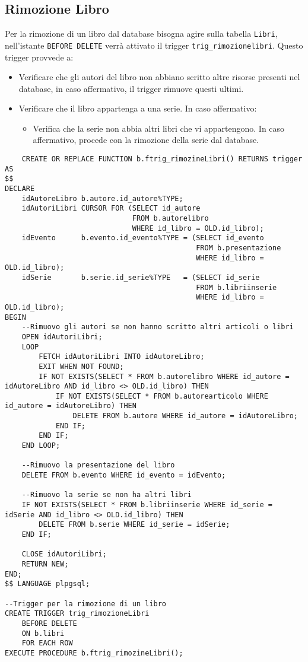 \subsection{Rimozione Libro}
Per la rimozione di un libro dal database bisogna agire sulla tabella \texttt{Libri}, nell'istante
\texttt{BEFORE DELETE} verr\`a attivato il trigger \texttt{trig\_rimozionelibri}. Questo trigger provvede a:
\begin{itemize}
    \item Verificare che gli autori del libro non abbiano scritto altre risorse presenti nel database, in
          caso affermativo, il trigger rimuove questi ultimi.
    \item Verificare che il libro appartenga a una serie. In caso affermativo:
    \begin{itemize}
        \item Verifica che la serie non abbia altri libri che vi appartengono. In caso affermativo,
        procede con la rimozione della serie dal database.
    \end{itemize}
\end{itemize}

\begin{lstlisting}
    CREATE OR REPLACE FUNCTION b.ftrig_rimozineLibri() RETURNS trigger AS
$$
DECLARE
    idAutoreLibro b.autore.id_autore%TYPE;
    idAutoriLibri CURSOR FOR (SELECT id_autore
                              FROM b.autorelibro
                              WHERE id_libro = OLD.id_libro);
    idEvento      b.evento.id_evento%TYPE = (SELECT id_evento
                                             FROM b.presentazione
                                             WHERE id_libro = OLD.id_libro);
    idSerie       b.serie.id_serie%TYPE   = (SELECT id_serie
                                             FROM b.libriinserie
                                             WHERE id_libro = OLD.id_libro);
BEGIN
    --Rimuovo gli autori se non hanno scritto altri articoli o libri
    OPEN idAutoriLibri;
    LOOP
        FETCH idAutoriLibri INTO idAutoreLibro;
        EXIT WHEN NOT FOUND;
        IF NOT EXISTS(SELECT * FROM b.autorelibro WHERE id_autore = idAutoreLibro AND id_libro <> OLD.id_libro) THEN
            IF NOT EXISTS(SELECT * FROM b.autorearticolo WHERE id_autore = idAutoreLibro) THEN
                DELETE FROM b.autore WHERE id_autore = idAutoreLibro;
            END IF;
        END IF;
    END LOOP;

    --Rimuovo la presentazione del libro
    DELETE FROM b.evento WHERE id_evento = idEvento;

    --Rimuovo la serie se non ha altri libri
    IF NOT EXISTS(SELECT * FROM b.libriinserie WHERE id_serie = idSerie AND id_libro <> OLD.id_libro) THEN
        DELETE FROM b.serie WHERE id_serie = idSerie;
    END IF;

    CLOSE idAutoriLibri;
    RETURN NEW;
END;
$$ LANGUAGE plpgsql;

--Trigger per la rimozione di un libro
CREATE TRIGGER trig_rimozioneLibri
    BEFORE DELETE
    ON b.libri
    FOR EACH ROW
EXECUTE PROCEDURE b.ftrig_rimozineLibri();
\end{lstlisting}

